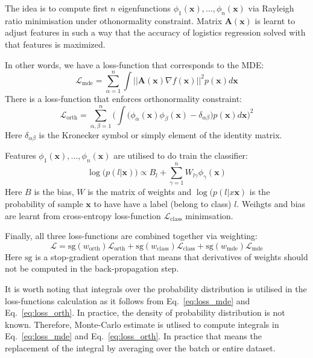 \documentclass{article}
\theoremstyle{plain}
\theoremstyle{definition}
\theoremstyle{remark}
\begin{document}
The idea is to compute first $n$ eigenfunctions $\phi_1(\mathbf{x}), ..., \phi_n(\mathbf{x})$ via Rayleigh ratio minimisation under othonormality constraint.
Matrix $\mathbf{A}(\mathbf{x})$ is learnt to adjust features in such a way that the accuracy of logistics regression 
solved with that features is maximized.

In other words, we have a loss-function that corresponds to the MDE:
\begin{equation}
    \label{eq:loss_mde}
    \mathcal{L}_{\text{mde}} = \sum_{\alpha=1}^{n} \int ||\mathbf{A}(\mathbf{x}) \nabla f(\mathbf{x})||^2 p(\mathbf{x}) d\mathbf{x}
\end{equation}
There is a loss-function that enforces orthonormality constraint:
\begin{equation}
    \label{eq:loss_orth}
    \mathcal{L}_{\text{orth}} = \sum_{\alpha, \beta=1}^{n} \bigg(\int \big(\phi_{\alpha}(\mathbf{x}) \phi_{\beta}(\mathbf{x}) - \delta_{\alpha\beta}\big) p(\mathbf{x}) d\mathbf{x} \bigg)^2
\end{equation}
Here $\delta_{\alpha\beta}$ is the Kronecker symbol or simply element of the identity matrix.

Features $\phi_1(\mathbf{x}), ..., \phi_n(\mathbf{x})$ are utilised to do train the classifier:
\begin{equation}
    \label{eq:class_log_prob}
    \log\big(p(l|\mathbf{x})\big) \propto B_l + \sum_{\gamma=1}^{n} W_{l\gamma} \phi_{\gamma}(\mathbf{x})
\end{equation}
Here $B$ is the bias, $W$ is the matrix of weights and $\log(p(l|x\mathbf{x})$ is the probability of sample $\mathbf{x}$
to have have a label (belong to class) $l$.
Weihgts and bias are learnt from cross-entropy loss-function $\mathcal{L}_{\text{class}}$ minimsation.

Finally, all three loss-functions are combined together via weighting:
\begin{equation}
    \label{eq:loss_function}
    \mathcal{L} = \text{sg}(w_{\text{orth}}) \mathcal{L}_{\text{orth}} + \text{sg}(w_{\text{class}}) \mathcal{L}_{\text{class}} + \text{sg}(w_{\text{mde}}) \mathcal{L}_{\text{mde}} 
\end{equation}
Here $\text{sg}$ is a stop-gradient operation that means that derivatives of weights should not be computed in 
the back-propagation step.

It is worth noting that integrals over the probability distribution is utilised in the loss-functions calculation
as it follows from Eq.~\eqref{eq:loss_mde} and Eq.~\eqref{eq:loss_orth}.
In practice, the density of probability distribution is not known.
Therefore, Monte-Carlo estimate is utlised to compute integrals in Eq.~\eqref{eq:loss_mde} and Eq.~\eqref{eq:loss_orth}.
In practice that means the replacement of the integral by averaging over the batch or entire dataset.
\end{document}
